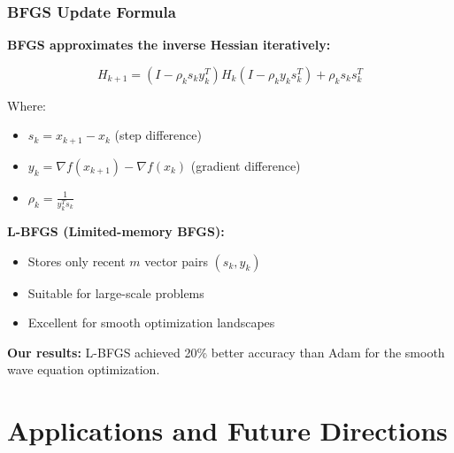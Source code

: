 \documentclass[notes]{beamer}
\begin{document}
\begin{frame}
\frametitle{BFGS Update Formula}

\textbf{BFGS approximates the inverse Hessian iteratively:}

\begin{equation*}
H_{k+1} = (I - \rho_k s_k y_k^T) H_k (I - \rho_k y_k s_k^T) + \rho_k s_k s_k^T
\end{equation*}

Where:
\begin{itemize}
    \item $s_k = x_{k+1} - x_k$ (step difference)
    \item $y_k = \nabla f(x_{k+1}) - \nabla f(x_k)$ (gradient difference)  
    \item $\rho_k = \frac{1}{y_k^T s_k}$
\end{itemize}

\vspace{1cm}

\textbf{L-BFGS (Limited-memory BFGS):}
\begin{itemize}
    \item Stores only recent $m$ vector pairs $(s_k, y_k)$
    \item Suitable for large-scale problems
    \item Excellent for smooth optimization landscapes
\end{itemize}

\textbf{Our results:} L-BFGS achieved 20\% better accuracy than Adam for the smooth wave equation optimization.

\end{frame}

\section{Applications and Future Directions}
\end{document}
